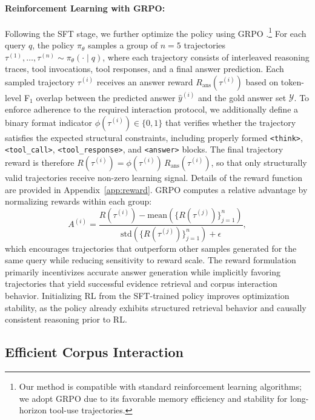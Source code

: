 \documentclass{article} %
\begin{document}
\paragraph{Reinforcement Learning with GRPO:}

Following the SFT stage, we further optimize the policy using GRPO \citep{grpo}.\footnote{Our method is compatible with standard reinforcement learning algorithms; we adopt GRPO due to its favorable memory efficiency and stability for long-horizon tool-use trajectories.} For each query $q$, the policy $\pi_\theta$ samples a group of $n=5$ trajectories
$\tau^{(1)}, \dots, \tau^{(n)} \sim \pi_\theta(\cdot \mid q)$,
where each trajectory consists of interleaved reasoning traces, tool invocations, tool responses, and a final answer prediction. Each sampled trajectory $\tau^{(i)}$ receives an answer reward
$R_{\mathrm{ans}}(\tau^{(i)})$ based on token-level F$_1$ \citep{rajpurkar-etal-2016-squad} overlap between the predicted answer $\hat{y}^{(i)}$ and the gold answer set $\mathcal{Y}$. To enforce adherence to the required interaction protocol, we additionally define a binary format indicator
$\phi(\tau^{(i)}) \in \{0,1\}$ that verifies whether the trajectory satisfies the expected structural constraints, including properly formed \texttt{<think>}, \texttt{<tool\_call>}, \texttt{<tool\_response>}, and \texttt{<answer>} blocks. The final trajectory reward is therefore
$R(\tau^{(i)}) = \phi(\tau^{(i)})\, R_{\mathrm{ans}}(\tau^{(i)})$, so that only structurally valid trajectories receive non-zero learning signal. Details of the reward function are provided in Appendix~\ref{app:reward}. GRPO computes a relative advantage by normalizing rewards within each group:
\[
A^{(i)} =
\frac{
R(\tau^{(i)}) - \mathrm{mean}(\{R(\tau^{(j)})\}_{j=1}^{n})
}{
\mathrm{std}(\{R(\tau^{(j)})\}_{j=1}^{n}) + \epsilon
},
\]
which encourages trajectories that outperform other samples generated for the same query while reducing sensitivity to reward scale. The reward formulation primarily incentivizes accurate answer generation while implicitly favoring trajectories that yield successful evidence retrieval and corpus interaction behavior. Initializing RL from the SFT-trained policy improves optimization stability, as the policy already exhibits structured retrieval behavior and causally consistent reasoning prior to RL.


\subsection{Efficient Corpus Interaction}
\label{sec:fast-retrieval}
\end{document}
